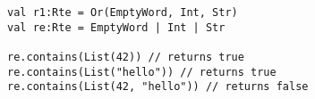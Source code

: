 \begin{lstlisting}[style=scalaioScala]
val r1:Rte = Or(EmptyWord, Int, Str)
val re:Rte = EmptyWord | Int | Str
      
re.contains(List(42)) // returns true
re.contains(List("hello")) // returns true
re.contains(List(42, "hello")) // returns false
\end{lstlisting}
